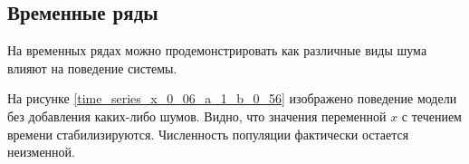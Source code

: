 \subsection{Временные ряды}

    На временных рядах можно продемонстрировать как различные виды шума влияют на поведение системы.

    На рисунке \ref{time_series_x_0_06_a_1_b_0_56} изображено поведение модели без добавления каких-либо шумов. Видно, что значения переменной \(x\) с течением времени стабилизируются. Численность популяции фактически остается неизменной.

    \begin{figure}
        \centering


\end{figure}
